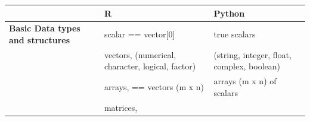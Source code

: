 \documentclass[]{book}
\theoremstyle{definition}
\theoremstyle{definition}
\theoremstyle{definition}
\theoremstyle{remark}
\begin{document}
\begin{longtable}[]{@{}lll@{}}
\toprule
\begin{minipage}[b]{0.19\columnwidth}\raggedright\strut
\strut
\end{minipage} & \begin{minipage}[b]{0.33\columnwidth}\raggedright\strut
R\strut
\end{minipage} & \begin{minipage}[b]{0.39\columnwidth}\raggedright\strut
Python\strut
\end{minipage}\tabularnewline
\midrule
\endhead
\begin{minipage}[t]{0.19\columnwidth}\raggedright\strut
\textbf{Basic Data types and structures }\strut
\end{minipage} & \begin{minipage}[t]{0.33\columnwidth}\raggedright\strut
scalar == vector{[}0{]}\strut
\end{minipage} & \begin{minipage}[t]{0.39\columnwidth}\raggedright\strut
true scalars\strut
\end{minipage}\tabularnewline
\begin{minipage}[t]{0.19\columnwidth}\raggedright\strut
\strut
\end{minipage} & \begin{minipage}[t]{0.33\columnwidth}\raggedright\strut
vectors, (numerical, character, logical, factor)\strut
\end{minipage} & \begin{minipage}[t]{0.39\columnwidth}\raggedright\strut
(string, integer, float, complex, boolean)\strut
\end{minipage}\tabularnewline
\begin{minipage}[t]{0.19\columnwidth}\raggedright\strut
\strut
\end{minipage} & \begin{minipage}[t]{0.33\columnwidth}\raggedright\strut
arrays, == vectors (m x n)\strut
\end{minipage} & \begin{minipage}[t]{0.39\columnwidth}\raggedright\strut
arrays (m x n) of scalars\strut
\end{minipage}\tabularnewline
\begin{minipage}[t]{0.19\columnwidth}\raggedright\strut
\strut
\end{minipage} & \begin{minipage}[t]{0.33\columnwidth}\raggedright\strut
matrices,\strut
\end{minipage} & \begin{minipage}[t]{0.39\columnwidth}\raggedright\strut

\end{minipage}
\end{longtable}
\end{document}
